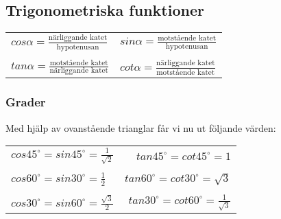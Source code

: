 \documentclass[11pt]{article}
\begin{document}
\subsection{Trigonometriska funktioner}
\begin{center}
\begin{tabular}{p{40mm}p{40mm}}
$ cos \alpha = \frac{\text{närliggande katet}}{\text{hypotenusan}}$ & 
$ sin \alpha = \frac{\text{motstående katet}}{\text{hypotenusan}}$ \\ & \\
$ tan \alpha = \frac{\text{motstående katet}}{\text{närliggande katet}} $ &
$ cot \alpha = \frac{\text{närliggande katet}}{\text{motstående katet}} $ \\
\end{tabular}
\end{center}
\begin{figure}[h]
  \begin{center}
  \label{bild}
  \end{center}
  \label{bild2}
\end{figure}

\subsubsection{Grader}
Med hjälp av ovanstående trianglar får vi nu ut följande värden: \\
\begin{center}
\begin{tabular}{lr}
	$ cos 45 ^\circ = sin 45 ^\circ = \frac{1}{\sqrt{2}} $	&	$ tan 45^\circ = cot 45^\circ = 1 $ \\ \\
	$ cos 60 ^\circ = sin 30 ^\circ = \frac{1}{2} $			&	$ tan 60^\circ = cot 30 ^\circ = \sqrt{3} $ \\ \\
	$ cos 30 ^\circ = sin 60 ^\circ = \frac{\sqrt{3}}{2} $	&	$ tan 30^\circ = cot 60 ^\circ = \frac{1}{\sqrt{3}} $ 

\end{tabular}	
\end{center}
\end{document}

